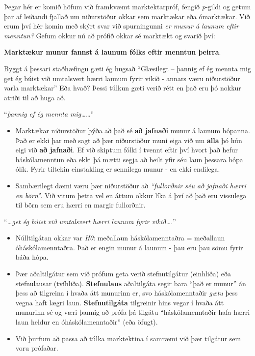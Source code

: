 \documentclass[
]{book}
\begin{document}
Þegar hér er komið höfum við framkvæmt marktektarpróf, fengið \emph{p}-gildi og getum þar af leiðandi fjallað um niðurstöður okkar sem marktækar eða ómarktækar. Við erum því hér komin með skýrt svar við spurningunni \emph{er munur á launum eftir menntun?} Gefum okkur nú að prófið okkar sé marktækt og svarið því:

\textbf{Marktækur munur fannst á launum fólks eftir menntun þeirra}.

Byggt á þessari staðhæfingu gæti ég hugsað ``Glæsilegt -- þannig ef ég mennta mig get ég búist við umtalsvert hærri launum fyrir vikið - annars væru niðurstöður varla marktækar'' Eða hvað? Þessi túlkun gæti verið rétt en það eru þó nokkur atriði til að huga að.

``\emph{þannig ef ég mennta mig\ldots\ldots{}}''

\begin{itemize}
\item
  Marktækar niðurstöður þýða að það sé \textbf{að jafnaði} munur á launum hópanna. Það er ekki þar með sagt að þær niðurstöður muni eiga við um \textbf{alla} þó hún eigi við \textbf{að jafnaði}. Ef við skiptum fólki í tvennt eftir því hvort það hefur háskólamenntun eða ekki þá mætti segja að heilt yfir séu laun þessara hópa ólík. Fyrir tiltekin einstakling er sennilega munur - en ekki endilega.
\item
  Sambærilegt dæmi væru þær niðurstöður að \emph{``fullorðnir séu að jafnaði hærri en börn}''. Við vitum þetta vel en áttum okkur líka á því að það eru vissulega til börn sem eru hærri en margir fullorðnir.
\end{itemize}

``\emph{\ldots get ég búist við umtalsvert hærri launum fyrir vikið\ldots.}''

\begin{itemize}
\item
  Núlltilgátan okkar var \emph{H0}: meðallaun háskólamenntaðra = meðallaun óháskólamenntaðra. Það er engin munur á launum - þau eru þau sömu fyrir báða hópa.
\item
  Þær aðaltilgátur sem við prófum geta verið stefnutilgátur (einhliða) eða stefnulausar (tvíhliða). \textbf{Stefnulaus} aðaltilgáta segir bara ``það er munur'' án þess að tilgreina í hvaða átt munurinn er, svo háskólamenntaðir \emph{gætu} þess vegna haft lægri laun. \textbf{Stefnutilgáta} tilgreinir hins vegar í hvaða átt munurinn sé og væri þannig að prófa þá tilgátu ``háskólamenntaðir hafa hærri laun heldur en óháskólamenntaðir'' (eða öfugt).
\item
  Við þurfum að passa að túlka marktektina í samræmi við þær tilgátur sem voru prófaðar.
\end{itemize}
\end{document}
